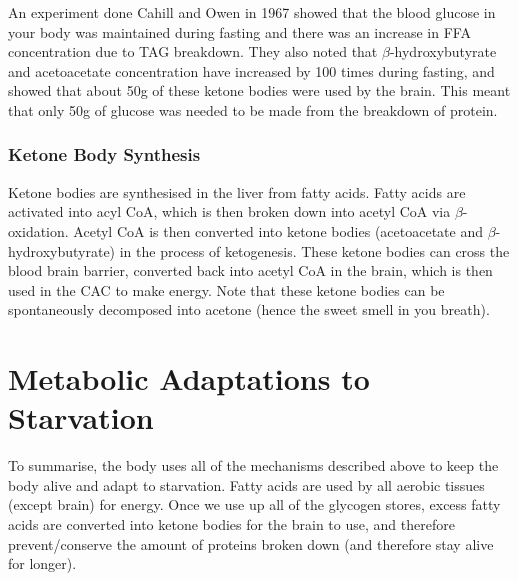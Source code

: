An experiment done Cahill and Owen in 1967 showed that the blood glucose in your body was maintained during fasting and there was an increase in FFA concentration due to TAG breakdown.
They also noted that $\beta$-hydroxybutyrate and acetoacetate concentration have increased by 100 times during fasting, and showed that about 50g of these ketone bodies were used by the brain.
This meant that only 50g of glucose was needed to be made from the breakdown of protein.

\subsubsection{Ketone Body Synthesis}

Ketone bodies are synthesised in the liver from fatty acids.
Fatty acids are activated into acyl CoA, which is then broken down into acetyl CoA via $\beta$-oxidation.
Acetyl CoA is then converted into ketone bodies (acetoacetate and $\beta$-hydroxybutyrate) in the process of ketogenesis.
These ketone bodies can cross the blood brain barrier, converted back into acetyl CoA in the brain, which is then used in the CAC to make energy.
Note that these ketone bodies can be spontaneously decomposed into acetone (hence the sweet smell in you breath).

\begin{center}
\end{center}

\section{Metabolic Adaptations to Starvation}

To summarise, the body uses all of the mechanisms described above to keep the body alive and adapt to starvation.
Fatty acids are used by all aerobic tissues (except brain) for energy.
Once we use up all of the glycogen stores, excess fatty acids are converted into ketone bodies for the brain to use, and therefore prevent/conserve the amount of proteins broken down (and therefore stay alive for longer).

